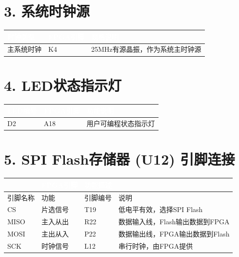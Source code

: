 \documentclass[12pt]{article}
\begin{document}
\section*{3. 系统时钟源}
\begin{table}[h]
    \centering
    \footnotesize
    \begin{tabular}{|C{4cm}|C{3cm}|C{7cm}|}
    \hline
    \textcolor{white}{\bfseries 时钟类型} & \textcolor{white}{\bfseries FPGA引脚} & \textcolor{white}{\bfseries 规格说明} \\
    \hline
    主系统时钟 & K4 & 25MHz有源晶振，作为系统主时钟源 \\
    \hline
    \end{tabular}
\end{table}

\section*{4. LED状态指示灯}
\begin{table}[h]
    \centering
    \footnotesize
    \begin{tabular}{|C{2cm}|C{2cm}|C{9cm}|}
    \hline
    \textcolor{white}{\bfseries LED编号} & \textcolor{white}{\bfseries FPGA引脚} & \textcolor{white}{\bfseries 功能说明} \\
    \hline
    D2 & A18 & 用户可编程状态指示灯 \\
    \hline
    \end{tabular}
\end{table}

\section*{5. SPI Flash存储器 (U12) 引脚连接}
\begin{table}[h]
    \centering
    \footnotesize
    \begin{tabular}{|C{2cm}|C{2.5cm}|C{2.5cm}|C{6cm}|}
    \hline
     & \textcolor{white}{\bfseries FPGA引脚} & \textcolor{white}{\bfseries 功能描述} \\
    \hline
    引脚名称 & 功能 & 引脚编号 & 说明 \\
    \hline
    CS & 片选信号 & T19 & 低电平有效，选择SPI Flash \\
    \hline
    MISO & 主入从出 & R22 & 数据输入线，Flash输出数据到FPGA \\
    \hline
    MOSI & 主出从入 & P22 & 数据输出线，FPGA输出数据到Flash \\
    \hline
    SCK & 时钟信号 & L12 & 串行时钟，由FPGA提供 \\
    \hline
    \end{tabular}
\end{table}
\end{document}
